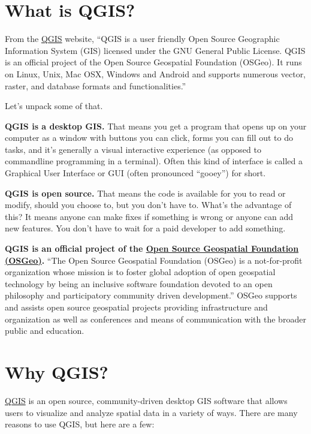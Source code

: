 \documentclass[
]{article}
\begin{document}
\hypertarget{what-is-qgis}{%
\section{What is QGIS?}\label{what-is-qgis}}

From the \href{https://qgis.org}{QGIS} website, ``QGIS is a user friendly Open Source Geographic Information System (GIS) licensed under the GNU General Public License. QGIS is an official project of the Open Source Geospatial Foundation (OSGeo). It runs on Linux, Unix, Mac OSX, Windows and Android and supports numerous vector, raster, and database formats and functionalities.''

Let's unpack some of that.

\textbf{QGIS is a desktop GIS.} That means you get a program that opens up on your computer as a window with buttons you can click, forms you can fill out to do tasks, and it's generally a visual interactive experience (as opposed to commandline programming in a terminal). Often this kind of interface is called a Graphical User Interface or GUI (often pronounced ``gooey'') for short.

\textbf{QGIS is open source.} That means the code is available for you to read or modify, should you choose to, but you don't have to. What's the advantage of this? It means anyone can make fixes if something is wrong or anyone can add new features. You don't have to wait for a paid developer to add something.

\textbf{QGIS is an official project of the \href{https://www.osgeo.org/}{Open Source Geospatial Foundation (OSGeo)}.} ``The Open Source Geospatial Foundation (OSGeo) is a not-for-profit organization whose mission is to foster global adoption of open geospatial technology by being an inclusive software foundation devoted to an open philosophy and participatory community driven development.'' OSGeo supports and assists open source geospatial projects providing infrastructure and organization as well as conferences and means of communication with the broader public and education.

\hypertarget{why-qgis}{%
\section{Why QGIS?}\label{why-qgis}}

\href{https://www.qgis.org}{QGIS} is an open source, community-driven desktop GIS software that allows users to visualize and analyze spatial data in a variety of ways. There are many reasons to use QGIS, but here are a few:
\end{document}

